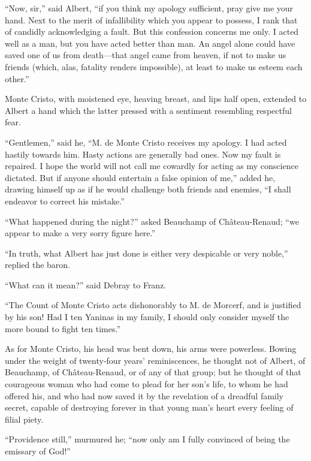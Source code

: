 “Now, sir,” said Albert, “if you think my apology sufficient, pray give
me your hand. Next to the merit of infallibility which you appear to
possess, I rank that of candidly acknowledging a fault. But this
confession concerns me only. I acted well as a man, but you have acted
better than man. An angel alone could have saved one of us from
death—that angel came from heaven, if not to make us friends (which,
alas, fatality renders impossible), at least to make us esteem each
other.”

Monte Cristo, with moistened eye, heaving breast, and lips half open,
extended to Albert a hand which the latter pressed with a sentiment
resembling respectful fear.

“Gentlemen,” said he, “M. de Monte Cristo receives my apology. I had
acted hastily towards him. Hasty actions are generally bad ones. Now my
fault is repaired. I hope the world will not call me cowardly for
acting as my conscience dictated. But if anyone should entertain a
false opinion of me,” added he, drawing himself up as if he would
challenge both friends and enemies, “I shall endeavor to correct his
mistake.”

“What happened during the night?” asked Beauchamp of Château-Renaud;
“we appear to make a very sorry figure here.”

“In truth, what Albert has just done is either very despicable or very
noble,” replied the baron.

“What can it mean?” said Debray to Franz.

“The Count of Monte Cristo acts dishonorably to M. de Morcerf, and is
justified by his son! Had I ten Yaninas in my family, I should only
consider myself the more bound to fight ten times.”

As for Monte Cristo, his head was bent down, his arms were powerless.
Bowing under the weight of twenty-four years’ reminiscences, he thought
not of Albert, of Beauchamp, of Château-Renaud, or of any of that
group; but he thought of that courageous woman who had come to plead
for her son’s life, to whom he had offered his, and who had now saved
it by the revelation of a dreadful family secret, capable of destroying
forever in that young man’s heart every feeling of filial piety.

“Providence still,” murmured he; “now only am I fully convinced of
being the emissary of God!”
